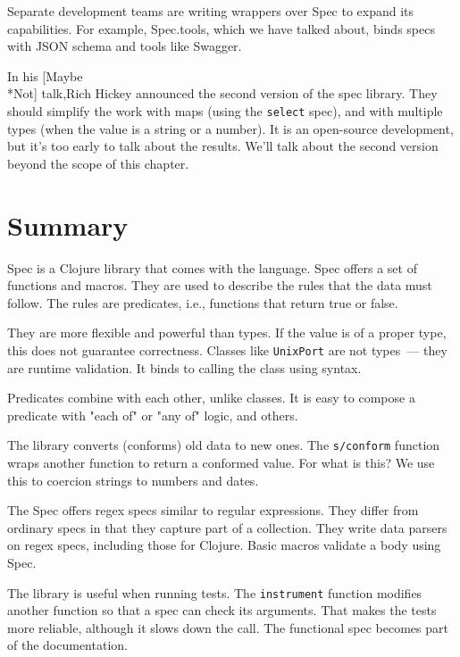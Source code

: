 Separate development teams are writing wrappers over Spec to expand its capabilities. For example, Spec.tools, which we have talked about, binds specs with JSON schema and tools like Swagger.


In his [Maybe\\*Not] talk,Rich Hickey announced the second version of the spec library. They should simplify the work with maps (using the \verb|select| spec), and with multiple types (when the value is a string or a number). It is an open-source development, but it's too early to talk about the results. We'll talk about the second version beyond the scope of this chapter.

\section{Summary}

Spec is a Clojure library that comes with the language. Spec offers a set of functions and macros. They are used to describe the rules that the data must follow. The rules are predicates, i.e., functions that return true or false.

They are more flexible and powerful than types. If the value is of a proper type, this does not guarantee correctness. Classes like \verb|UnixPort| are not types~--- they are runtime validation. It binds to calling the class using syntax.

Predicates combine with each other, unlike classes. It is easy to compose a predicate with "each of" or "any of" logic, and others.

The library converts (conforms) old data to new ones. The \verb|s/conform| function wraps another function to return a conformed value. For what is this? We use this to coercion strings to numbers and dates.

The Spec offers regex specs similar to regular expressions. They differ from ordinary specs in that they capture part of a collection. They write data parsers on regex specs, including those for Clojure. Basic macros validate a body using Spec.

The library is useful when running tests. The \verb|instrument| function modifies another function so that a spec can check its arguments. That makes the tests more reliable, although it slows down the call. The functional spec becomes part of the documentation.
